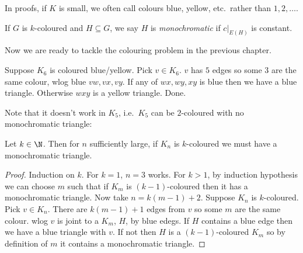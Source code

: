 \documentclass[a4paper]{article}
\begin{document}
In proofs, if \(K\) is small, we often call colours blue, yellow, etc.\ rather than \(1, 2, \dots\).

\begin{definition}[monochromatic]
  If \(G\) is \(k\)-coloured and \(H \subseteq G\), we say \(H\) is \emph{monochromatic} if \(c|_{E(H)}\) is constant.
\end{definition}

Now we are ready to tackle the colouring problem in the previous chapter.

\begin{eg}
  Suppose \(K_6\) is coloured blue/yellow. Pick \(v \in K_6\). \(v\) has \(5\) edges so some \(3\) are the same colour, wlog blue \(vw, vx, vy\). If any of \(wx, wy, xy\) is blue then we have a blue triangle. Otherwise \(wxy\) is a yellow triangle. Done.
\end{eg}

\begin{note}
  Note that it doesn't work in \(K_5\), i.e.\ \(K_5\) can be \(2\)-coloured with no monochromatic triangle:
  \begin{center}
  \end{center}
\end{note}

\begin{proposition}
  Let \(k \in \N\). Then for \(n\) sufficiently large, if \(K_n\) is \(k\)-coloured we must have a monochromatic triangle.
\end{proposition}

\begin{proof}
  Induction on \(k\). For \(k = 1\), \(n = 3\) works. For \(k > 1\), by induction hypothesis we can choose \(m\) such that if \(K_m\) is \((k - 1)\)-coloured then it has a monochromatic triangle. Now take \(n = k(m - 1) + 2\). Suppose \(K_n\) is \(k\)-coloured. Pick \(v \in K_n\). There are \(k(m - 1) + 1\) edges from \(v\) so some \(m\) are the same colour. wlog \(v\) is joint to a \(K_m\), \(H\), by blue edegs. If \(H\) contains a blue edge then we have a blue triangle with \(v\). If not then \(H\) is a \((k - 1)\)-coloured \(K_m\) so by definition of \(m\) it contains a monochromatic triangle.
\end{proof}
\end{document}
